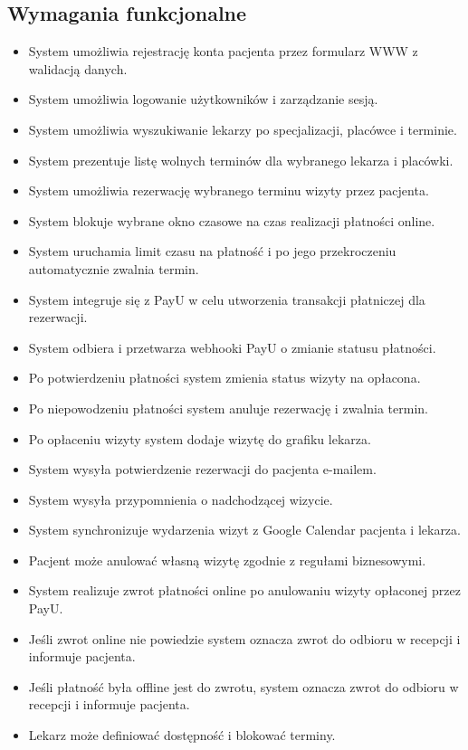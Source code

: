 \documentclass[12pt]{article}
\begin{document}
\subsection{Wymagania funkcjonalne}
\begin{itemize}
\item System umożliwia rejestrację konta pacjenta przez formularz WWW z walidacją danych.
\item System umożliwia logowanie użytkowników i zarządzanie sesją.
\item System umożliwia wyszukiwanie lekarzy po specjalizacji, placówce i terminie.
\item System prezentuje listę wolnych terminów dla wybranego lekarza i placówki.
\item System umożliwia rezerwację wybranego terminu wizyty przez pacjenta.
\item System blokuje wybrane okno czasowe na czas realizacji płatności online.
\item System uruchamia limit czasu na płatność i po jego przekroczeniu automatycznie zwalnia termin.
\item System integruje się z PayU w celu utworzenia transakcji płatniczej dla rezerwacji.
\item System odbiera i przetwarza webhooki PayU o zmianie statusu płatności.
\item Po potwierdzeniu płatności system zmienia status wizyty na opłacona.
\item Po niepowodzeniu płatności system anuluje rezerwację i zwalnia termin.
\item Po opłaceniu wizyty system dodaje wizytę do grafiku lekarza.
\item System wysyła potwierdzenie rezerwacji do pacjenta e-mailem.
\item System wysyła przypomnienia o nadchodzącej wizycie.
\item System synchronizuje wydarzenia wizyt z Google Calendar pacjenta i lekarza.
\item Pacjent może anulować własną wizytę zgodnie z regułami biznesowymi.
\item System realizuje zwrot płatności online po anulowaniu wizyty opłaconej przez PayU.
\item Jeśli zwrot online nie powiedzie system oznacza zwrot do odbioru w recepcji i informuje pacjenta.
\item Jeśli płatność była offline jest do zwrotu, system oznacza zwrot do odbioru w recepcji i informuje pacjenta.
\item Lekarz może definiować dostępność i blokować terminy.

\end{itemize}
\end{document}
